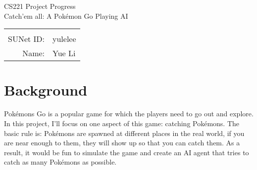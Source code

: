 \documentclass[12pt]{article}
\begin{document}
\begin{center}
{\Large CS221 Project Progress\\
Catch'em all: A Pok\'emon Go Playing AI}

\begin{tabular}{rl}
\newline
\\ 
SUNet ID: & yulelee \\
Name: & Yue Li \\
\end{tabular}
\end{center}
\section*{Background}
Pok\'emons Go is a popular game for which
the players need to go out and explore. 
In this project, I'll focus on 
one aspect of this game: 
catching Pok\'emons. The basic rule is: Pok\'emons are spawned at
different places in the real world, if you are near enough to them, 
they will show up so that 
you can catch them. 
As a result, it would be fun to simulate the game and create an
AI agent that tries to catch
as many Pok\'emons as possible. 
\end{document}
